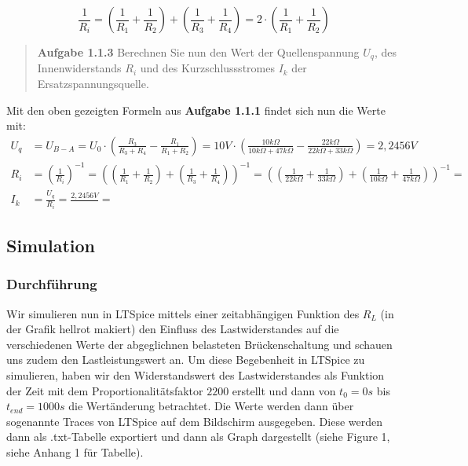 \documentclass{scrarticle}
\begin{document}
\begin{equation*}
  \frac{1}{R_i} = \left(\frac{1}{R_1} + \frac{1}{R_2}\right) + \left(\frac{1}{R_3} + \frac{1}{R_4}\right) = 2\cdot\left(\frac{1}{R_1} + \frac{1}{R_2}\right)
\end{equation*}
\begin{abstract}
  \textbf{Aufgabe 1.1.3} Berechnen Sie nun den Wert der Quellenspannung $U_q$, des Innenwiderstands $R_i$ und des Kurzschlussstromes $I_k$ der Ersatzspannungsquelle.
\end{abstract}
Mit den oben gezeigten Formeln aus \textbf{Aufgabe 1.1.1} findet sich nun die Werte mit:
\begin{equation*}
  \begin{aligned}
    U_q &= U_{B-A} = U_0 \cdot \left(\frac{R_3}{R_3+R_4} - \frac{R_1}{R_1+R_2}\right) = 10V \cdot \left(\frac{10k\Omega}{10k\Omega+47k\Omega} - \frac{22k\Omega}{22k\Omega+33k\Omega}\right) = 2,2456V\\
    R_i &= \left(\frac{1}{R_i}\right)^{-1} = \left(\left(\frac{1}{R_1} + \frac{1}{R_2}\right) + \left(\frac{1}{R_3} + \frac{1}{R_4}\right)\right)^{-1} = \left(\left(\frac{1}{22k\Omega} + \frac{1}{33k\Omega}\right) + \left(\frac{1}{10k\Omega} + \frac{1}{47k\Omega}\right)\right)^{-1} = \\
    I_k &= \frac{U_q}{R_i} = \frac{2,2456V}{} = 
  \end{aligned}
\end{equation*}
\vspace{1.5cm}

\subsection{Simulation}


\subsubsection{Durchführung}
Wir simulieren nun in LTSpice mittels einer zeitabhängigen Funktion des $R_L$ (in der Grafik hellrot makiert) den Einfluss des Lastwiderstandes
auf die verschiedenen Werte der abgeglichnen belasteten Brückenschaltung und schauen uns zudem den Lastleistungswert an. 
Um diese Begebenheit in LTSpice zu simulieren, haben wir den Widerstandswert des Lastwiderstandes als Funktion der Zeit mit dem 
Proportionalitätsfaktor $2200$ erstellt und dann von $t_0 = 0s$ bis $t_{end} = 1000s$ die Wertänderung betrachtet. Die Werte werden dann über
sogenannte Traces von LTSpice auf dem Bildschirm ausgegeben. Diese werden dann als .txt-Tabelle exportiert und dann als Graph dargestellt (siehe Figure 1, siehe Anhang 1 für Tabelle).
\end{document}

